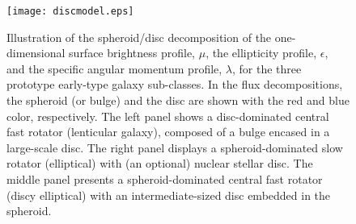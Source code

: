 \documentclass[useAMS,usenatbib,article]{mnras}
\begin{document}


\begin{figure}
\begin{center}
\texttt{[image: discmodel.eps]}
\caption{Illustration of the spheroid/disc decomposition of the one-dimensional surface brightness profile, $\mu$, 
the ellipticity profile, $\epsilon$, and the specific angular momentum profile, $\lambda$,
for the three prototype early-type galaxy sub-classes. 
In the flux decompositions, the spheroid (or bulge) and the disc are shown with the red and blue color, respectively. 
The left panel shows a disc-dominated central fast rotator (lenticular galaxy), composed of a bulge encased in a large-scale disc. 
The right panel displays a spheroid-dominated slow rotator (elliptical) with (an optional) nuclear stellar disc. 
The middle panel presents a spheroid-dominated central fast rotator (discy elliptical) with an intermediate-sized disc embedded in the spheroid. }
\label{fig:model}
\end{center}
\end{figure}
\end{document}

